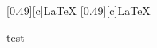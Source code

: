 \documentclass[11pt]{article}
\begin{document}
\begin{figure}[h!]
    \centering
    [0.49\linewidth][c]{\LaTeX}%
    \hfill
    [0.49\linewidth][c]{\LaTeX}%
    \caption{test}
    \label{test1}
\end{figure}
\end{document}
